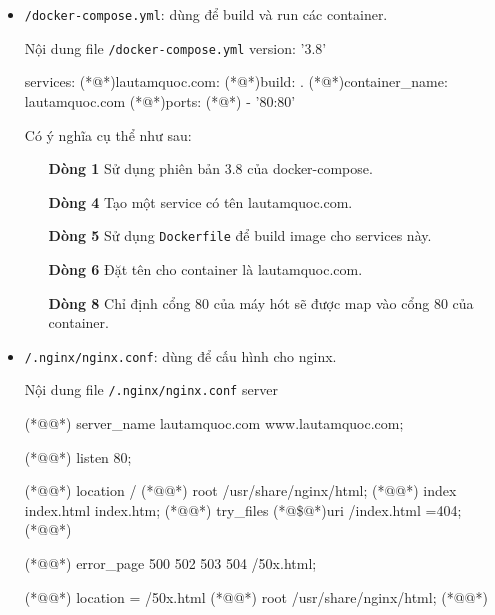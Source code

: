 \begin{itemize}[label={--}]
  \item \texttt{/docker-compose.yml}: dùng để build và run các container.\\
        \begin{coding}[gobble=10]{Nội dung file \texttt{/docker-compose.yml}}
          version: '3.8'

          services:
          (*@\quad@*)lautamquoc.com:
          (*@\qquad@*)build: .
          (*@\qquad@*)container_name: lautamquoc.com
          (*@\qquad@*)ports:
          (*@\qquad@*)  - '80:80'
        \end{coding}

        Có ý nghĩa cụ thể như sau:
        \begin{itemize}
          \item[\bfseries Dòng 1] Sử dụng phiên bản 3.8 của docker-compose.
          \item[\bfseries Dòng 4] Tạo một service có tên lautamquoc.com.
          \item[\bfseries Dòng 5] Sử dụng \texttt{Dockerfile} để build image cho services này.
          \item[\bfseries Dòng 6] Đặt tên cho container là lautamquoc.com.
          \item[\bfseries Dòng 8] Chỉ định cổng 80 của máy hót sẽ được map vào cổng 80 của container.
        \end{itemize}

  \item \texttt{/.nginx/nginx.conf}: dùng để cấu hình cho nginx.\\
        \begin{coding}[gobble=10]{Nội dung file \texttt{/.nginx/nginx.conf}}
          server {
          (*@@*) server_name lautamquoc.com www.lautamquoc.com;

          (*@@*) listen 80;

          (*@@*) location / {
          (*@@*)  root /usr/share/nginx/html;
          (*@@*)  index index.html index.htm;
          (*@@*)  try_files (*@\$@*)uri /index.html =404;
          (*@@*) }

          (*@@*) error_page 500 502 503 504 /50x.html;

          (*@@*) location = /50x.html {
          (*@@*)  root /usr/share/nginx/html;
          (*@@*) }
          }
        \end{coding}


\end{itemize}
